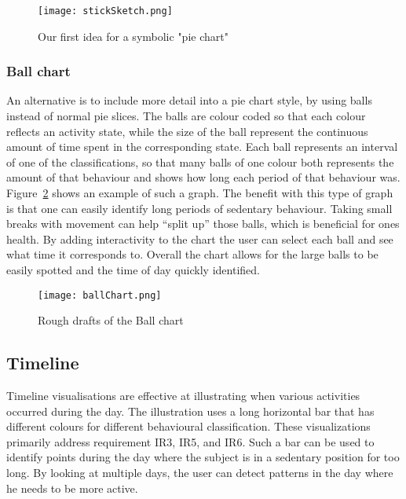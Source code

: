 \begin{figure}[h!]
	\centering
		\texttt{[image: stickSketch.png]}
		\caption{\footnotesize Our first idea for a symbolic "pie chart"}
		\label{fig:symbolicPie}
\end{figure}

\subsubsection{Ball chart}
An alternative is to include more detail into a pie chart style, by using balls instead of normal pie slices. The balls are colour coded so that each colour reflects an activity state, while the size of the ball represent the continuous amount of time spent in the corresponding state. Each ball represents an interval of one of the classifications, so that many balls of one colour both represents the amount of that behaviour and shows how long each period of that behaviour was. Figure~\ref{fig:ballChart} shows an example of such a graph. The benefit with this type of graph is that one can easily identify long periods of sedentary behaviour. Taking small breaks with movement can help ``split up'' those balls, which is beneficial for ones health. By adding interactivity to the chart the user can select each ball and see what time it corresponds to. Overall the chart allows for the large balls to be easily spotted and the time of day quickly identified.

\begin{figure}[h!]
	\centering
		\texttt{[image: ballChart.png]}
		\caption{\footnotesize Rough drafts of the Ball chart}
		\label{fig:ballChart}
\end{figure}

\subsection{Timeline}
Timeline visualisations are effective at illustrating when various activities occurred during the day. The illustration uses a long horizontal bar that has different colours for different behavioural classification. These visualizations primarily address requirement IR3, IR5, and IR6. Such a bar can be used to identify points during the day where the subject is in a sedentary position for too long. By looking at multiple days, the user can detect patterns in the day where he needs to be more active.

